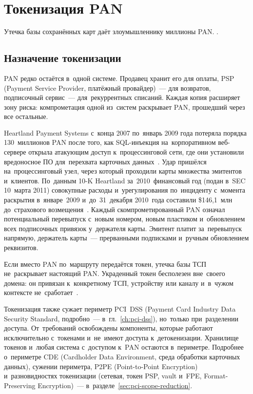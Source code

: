 
\chapter{Токенизация PAN}\label{ch:tokenization}
Утечка базы сохранённых карт даёт злоумышленнику миллионы PAN.
.

\section{Назначение токенизации}\label{sec:token-problem}

PAN редко остаётся в~одной системе. Продавец хранит его для оплаты, PSP (Payment
Service Provider, платёжный провайдер)~--- для возвратов, подписочный
сервис~--- для~рекуррентных списаний. Каждая копия расширяет зону риска:
компрометация одной из~систем раскрывает PAN, прошедший через все остальные.

Heartland Payment Systems с~конца 2007 по~январь 2009 года потеряла порядка 130~миллионов PAN
после того, как SQL-инъекция на~корпоративном веб-сервере открыла атакующим
доступ к~процессинговой сети, где они установили вредоносное ПО для~перехвата
карточных данных~\cite{doj-heartland-2009}. Удар пришёлся на~процессинговый
узел, через который проходили карты множества эмитентов и~клиентов. По~данным 10-K Heartland за~2010~финансовый год (подан
в~SEC 10~марта 2011) совокупные расходы и~урегулирования по~инциденту с~момента
раскрытия в~январе~2009 и~до~31~декабря 2010~года составили \$146,1~млн
до~страхового возмещения~\cite{heartland-sec-2013}. Каждый скомпрометированный
PAN означал потенциальный перевыпуск с~новым номером, новым пластиком
и~обновлением всех подписочных привязок у~держателя карты. Эмитент платит
за~перевыпуск напрямую, держатель карты~--- прерванными подписками и~ручным
обновлением реквизитов.

Если вместо PAN по~маршруту передаётся токен, утечка базы ТСП не~раскрывает настоящий
PAN. Украденный токен бесполезен вне~своего домена: он привязан к~конкретному
ТСП, устройству или каналу и~в~чужом контексте
не~сработает~\cite{emvco-payment-tokenisation}.

Токенизация также сужает периметр PCI~DSS (Payment Card Industry Data Security
Standard, подробно~--- в~гл.~\ref{ch:pci-dss}), но~только при~разделении
доступа. От~требований освобождены компоненты, которые работают
исключительно с~токенами и~не~имеют доступа к~детокенизации. Хранилище токенов
и~любая система с~доступом к~PAN остаются в~периметре.
Подробнее о~периметре CDE (Cardholder Data Environment, среда обработки
карточных данных), сужении периметра, P2PE (Point-to-Point Encryption)
и~разновидностях токенизации (сетевая, токен PSP, vault и~FPE,
Format-Preserving Encryption)~--- в~разделе~\ref{sec:pci-scope-reduction}.

